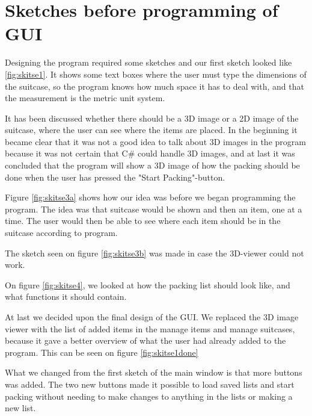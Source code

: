 \section{Sketches before programming of GUI}
Designing the program required some sketches and our first sketch looked like \ref{fig:skitse1}.
It shows some text boxes where the user must type the dimensions of the suitcase, so the program knows how much space it has to deal with, and that the measurement is the metric unit system.


It has been discussed whether there should be a 3D image or a 2D image of the suitcase, where the user can see where the items are placed. In the beginning it became clear that it was not a good idea to talk about 3D images in the program because it was not certain that C\# could handle 3D images, and at last it was concluded that the program will show a 3D image of how the packing should be done when the user has pressed the "Start Packing"-button.

Figure \ref{fig:skitse3a} shows how our idea was before we began programming the program. The idea was that suitcase would be shown and then an item, one at a time. The user would then be able to see where each item should be in the suitcase according to program.


The sketch seen on figure \ref{fig:skitse3b} was made in case the 3D-viewer could not work.

On figure \ref{fig:skitse4}, we looked at how the packing list should look like, and what functions it should contain.


At last we decided upon the final design of the GUI. We replaced the 3D image viewer with the list of added items in the manage items and manage suitcases, because it gave a better overview of what the user had already added to the program. This can be seen on figure \ref{fig:skitse1done} 


What we changed from the first sketch of the main window is that more buttons was added. The two new buttons made it possible to load saved lists and start packing without needing to make changes to anything in the lists or making a new list.

